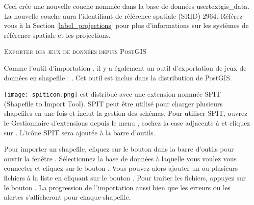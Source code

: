 Ceci crée une nouvelle couche nommée  dans la base de données usertext{gis\_data}. La nouvelle couche aura l'identifiant de référence spatiale (SRID) 2964. Référez-vous à la Section \ref{label_projections} pour plus d'informations sur les systèmes de référence spatiale et les projections.
\begin{Tip}
\caption{\textsc{Exporter des jeux de données depuis PostGIS}}
Comme l'outil d'importation , il y a également un outil d'exportation de jeux de données \pg en shapefile : . Cet outil est inclus dans la distribution de PostGIS.
\end{Tip}

\texttt{[image: spiticon.png]} \qg est distribué avec une extension nommée SPIT (Shapefile to \pg Import Tool). SPIT peut être utilisé pour charger plusieurs shapefiles en une fois et inclut la gestion des schémas. Pour utiliser SPIT, ouvrez le Gestionnaire d'extensions depuis le menu , cochez la case adjacente à  et cliquez sur . L'icône SPIT sera ajoutée à la barre d'outils.

Pour importer un shapefile, cliquez sur le bouton  dans la barre d'outils pour ouvrir la fenêtre . Sélectionnez la base de données à laquelle vous voulez vous connecter et cliquez sur le bouton . Vous pouvez alors ajouter un ou plusieurs fichiers à la liste en cliquant sur le bouton . Pour traiter les fichiers, appuyez sur le bouton . La progression de l'importation aussi bien que les erreurs ou les alertes s'afficheront pour chaque shapefile.

